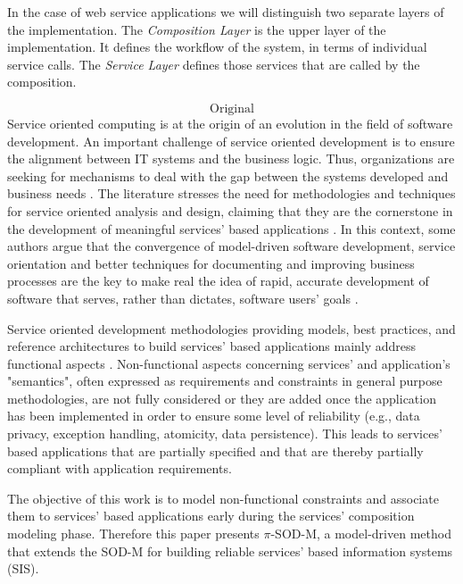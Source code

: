 In the case of web service applications we will distinguish two separate layers of the implementation.
The \textit{Composition Layer} is the upper layer of the implementation. 
It defines the workflow of the system, in terms of individual service calls.
The \textit{Service Layer} defines those services that are called by the composition.

\[ \mathrm{Original} \]
Service oriented computing is at the origin of an evolution in the field of software development. 
An important challenge of service oriented development is  to ensure the alignment between IT systems and the business logic.
Thus, organizations are  seeking for mechanisms to deal with the gap between the systems developed and business needs \cite{bell}. The literature stresses the need for methodologies and techniques for service oriented analysis and design, claiming that they are the cornerstone  in the development of meaningful services' based applications \cite{5}.  In this context, some authors argue that the convergence of model-driven software development, service orientation and better techniques for documenting and improving business processes are the key to make real the idea of rapid, accurate development of software that serves, rather than dictates, software users' goals \cite{watson}. 

Service oriented development methodologies providing models, best practices, and reference architectures to build services' based applications mainly address  functional aspects \cite{1,2,decastro1,PapazoglouH06}.  Non-functional aspects concerning services' and application's "semantics", often expressed as requirements and constraints in general purpose methodologies, are not fully considered or they are added once the application has been implemented in order to ensure some level of reliability (e.g., data privacy, exception handling, atomicity, data persistence). This leads to services' based applications that are partially specified and that are thereby partially compliant with application requirements.

The objective of this work   is to model non-functional constraints and associate them to  services' based applications  early during the services' composition modeling phase. Therefore this paper presents $\pi$-SOD-M, a model-driven method  that extends the SOD-M  \cite{decastro1} for building reliable  services' based information systems (SIS). 

